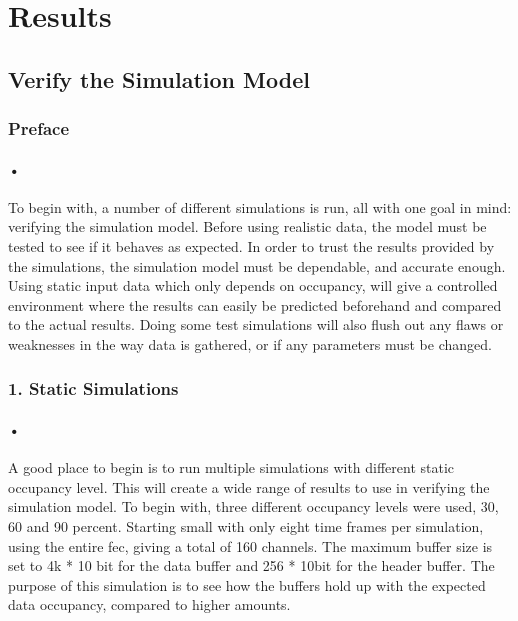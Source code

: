 \documentclass[a4paper, 12pt]{report}
\begin{document}
\section{Results}

\subsection{Verify the Simulation Model}

\subsubsection{Preface}

\paragraph{•}
To begin with, a number of different simulations is run, all with one goal in mind: verifying the simulation model.
Before using realistic data, the model must be tested to see if it behaves as expected.
In order to trust the results provided by the simulations, the simulation model must be dependable, and accurate enough.
Using static input data which only depends on occupancy, will give a controlled environment where the results can easily be predicted beforehand and compared to the actual results.
Doing some test simulations will also flush out any flaws or weaknesses in the way data is gathered, or if any parameters must be changed.

\subsubsection{1. Static Simulations}
\paragraph{•}
A good place to begin is to run multiple simulations with different static occupancy level.
This will create a wide range of results to use in verifying the simulation model.
To begin with, three different occupancy levels were used, 30, 60 and 90 percent.
Starting small with only eight time frames per simulation, using the entire \gls{fec}, giving a total of 160 channels.
The maximum buffer size is set to 4k * 10 bit for the data buffer and 256 * 10bit for the header buffer.
The purpose of this simulation is to see how the buffers hold up with the expected data occupancy, compared to higher amounts.
\end{document}
